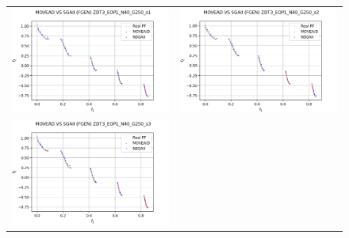 \begin{figure}[H]
    \centering
    \begin{tabular}{c c}
    \includegraphics[scale=0.5]{figures/ZDT3_EOP1_N40_G250_T6/s1_comp.png} &
    \includegraphics[scale=0.5]{figures/ZDT3_EOP1_N40_G250_T6/s2_comp.png}\\
    \includegraphics[scale=0.5]{figures/ZDT3_EOP1_N40_G250_T6/s3_comp.png} &

\end{tabular}
\end{figure}
